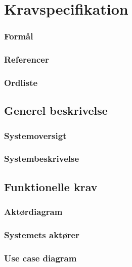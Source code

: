 \chapter{Kravspecifikation}
\label{ch:kravspecifikation}

\subsection{Formål}
\subsection{Referencer}
\subsection{Ordliste}

\section{Generel beskrivelse}
\subsection{Systemoversigt}
\subsection{Systembeskrivelse}

\section{Funktionelle krav}
\subsection{Aktørdiagram}
\subsection{Systemets aktører}
\subsection{Use case diagram}
